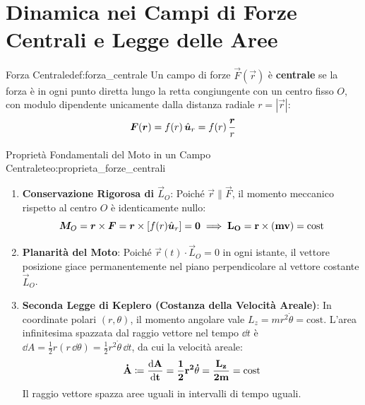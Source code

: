 \section{Dinamica nei Campi di Forze Centrali e Legge delle Aree}
\label{sec:forze_centrali}

\begin{definizione}{Forza Centrale}{def:forza_centrale}
Un campo di forze $\vec{F}(\vec{r})$ è \textbf{centrale} se la forza è in ogni punto diretta lungo la retta congiungente con un centro fisso $O$, con modulo dipendente unicamente dalla distanza radiale $r = |\vec{r}|$:
\begin{equation}
    \bm{F}(\bm{r}) = f(r)\,\hat{\bm{u}}_r = f(r)\,\frac{\bm{r}}{r}
    \label{eq:campo_centrale}
\end{equation}
\end{definizione}

\begin{teorema}{Proprietà Fondamentali del Moto in un Campo Centrale}{teo:proprieta_forze_centrali}
\begin{enumerate}
    \item \textbf{Conservazione Rigorosa di $\vec{L}_O$}: Poiché $\vec{r} \parallel \vec{F}$, il momento meccanico rispetto al centro $O$ è identicamente nullo:
    \begin{equation}
        \bm{M}_O = \bm{r} \times \bm{F} = \bm{r} \times [f(r)\hat{\bm{u}}_r] = \bm{0} \implies \mathbf{\bm{L}_O = \bm{r}\times(m\bm{v}) = \text{cost}}
    \end{equation}
    \item \textbf{Planarità del Moto}: Poiché $\vec{r}(t)\cdot\vec{L}_O = 0$ in ogni istante, il vettore posizione giace permanentemente nel piano perpendicolare al vettore costante $\vec{L}_O$.
    \item \textbf{Seconda Legge di Keplero (Costanza della Velocità Areale)}: In coordinate polari $(r, \theta)$, il momento angolare vale $L_z = m r^2 \dot{\theta} = \text{cost}$. L'area infinitesima spazzata dal raggio vettore nel tempo $\dd t$ è $\dd A = \frac{1}{2}r (r\,\dd\theta) = \frac{1}{2}r^2\dot{\theta}\,\dd t$, da cui la velocità areale:
    \begin{equation}
        \mathbf{\dot{A} \coloneqq \frac{\mathrm{d} A}{\mathrm{d} t} = \frac{1}{2}r^2\dot{\theta} = \frac{L_z}{2m} = \text{cost}}
        \label{eq:velocita_areale}
    \end{equation}
    Il raggio vettore spazza aree uguali in intervalli di tempo uguali.
\end{enumerate}
\end{teorema}

